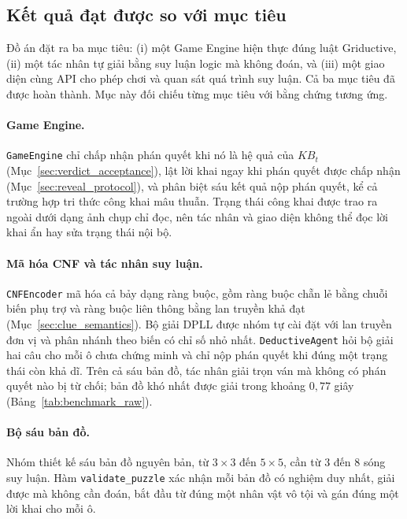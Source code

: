 \subsection{Kết quả đạt được so với mục tiêu}
\label{sec:achievements}

Đồ án đặt ra ba mục tiêu: (i) một Game Engine hiện thực đúng luật Griductive,
(ii) một tác nhân tự giải bằng suy luận logic mà không đoán, và (iii) một giao
diện cùng API cho phép chơi và quan sát quá trình suy luận. Cả ba mục tiêu đã
được hoàn thành. Mục này đối chiếu từng mục tiêu với bằng chứng tương ứng.

\paragraph{Game Engine.}
\texttt{GameEngine} chỉ chấp nhận phán quyết khi nó là hệ quả của
$\mathit{KB}_t$ (Mục~\ref{sec:verdict_acceptance}), lật lời khai ngay khi phán
quyết được chấp nhận (Mục~\ref{sec:reveal_protocol}), và phân biệt sáu kết quả
nộp phán quyết, kể cả trường hợp tri thức công khai mâu thuẫn. Trạng thái công
khai được trao ra ngoài dưới dạng ảnh chụp chỉ đọc, nên tác nhân và giao diện
không thể đọc lời khai ẩn hay sửa trạng thái nội bộ.

\paragraph{Mã hóa CNF và tác nhân suy luận.}
\texttt{CNFEncoder} mã hóa cả bảy dạng ràng buộc, gồm ràng buộc chẵn lẻ bằng
chuỗi biến phụ trợ và ràng buộc liên thông bằng lan truyền khả đạt
(Mục~\ref{sec:clue_semantics}). Bộ giải DPLL \cite{davis1962dpll} được nhóm tự
cài đặt với lan truyền đơn vị và phân nhánh theo biến có chỉ số nhỏ nhất.
\texttt{DeductiveAgent} hỏi bộ giải hai câu cho mỗi ô chưa chứng minh và chỉ
nộp phán quyết khi đúng một trạng thái còn khả dĩ. Trên cả sáu bản đồ, tác nhân
giải trọn ván mà không có phán quyết nào bị từ chối; bản đồ khó nhất được giải
trong khoảng $0{,}77$ giây (Bảng~\ref{tab:benchmark_raw}).

\paragraph{Bộ sáu bản đồ.}
Nhóm thiết kế sáu bản đồ nguyên bản, từ $3\times3$ đến $5\times5$, cần từ $3$
đến $8$ sóng suy luận. Hàm \texttt{validate\_puzzle} xác nhận mỗi bản đồ có
nghiệm duy nhất, giải được mà không cần đoán, bắt đầu từ đúng một nhân vật vô
tội và gán đúng một lời khai cho mỗi ô.

